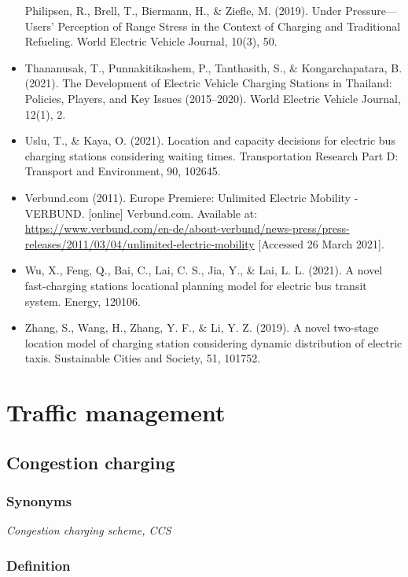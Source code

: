 \documentclass[
]{book}
\begin{document}
\begin{itemize}
  Philipsen, R., Brell, T., Biermann, H., \& Ziefle, M. (2019). Under Pressure---Users' Perception of Range Stress in the Context of Charging and Traditional Refueling. World Electric Vehicle Journal, 10(3), 50.
\item
  Thananusak, T., Punnakitikashem, P., Tanthasith, S., \& Kongarchapatara, B. (2021). The Development of Electric Vehicle Charging Stations in Thailand: Policies, Players, and Key Issues (2015--2020). World Electric Vehicle Journal, 12(1), 2.
\item
  Uslu, T., \& Kaya, O. (2021). Location and capacity decisions for electric bus charging stations considering waiting times. Transportation Research Part D: Transport and Environment, 90, 102645.
\item
  Verbund.com (2011). Europe Premiere: Unlimited Electric Mobility - VERBUND. {[}online{]} Verbund.com. Available at: \url{https://www.verbund.com/en-de/about-verbund/news-press/press-releases/2011/03/04/unlimited-electric-mobility} {[}Accessed 26 March 2021{]}.
\item
  Wu, X., Feng, Q., Bai, C., Lai, C. S., Jia, Y., \& Lai, L. L. (2021). A novel fast-charging stations locational planning model for electric bus transit system. Energy, 120106.
\item
  Zhang, S., Wang, H., Zhang, Y. F., \& Li, Y. Z. (2019). A novel two-stage location model of charging station considering dynamic distribution of electric taxis. Sustainable Cities and Society, 51, 101752.
\end{itemize}

\hypertarget{traffic}{%
\chapter{Traffic management}\label{traffic}}

\hypertarget{congestion_charging}{%
\section{Congestion charging}\label{congestion_charging}}

\hypertarget{synonyms-7}{%
\subsection*{Synonyms}\label{synonyms-7}}

\emph{Congestion charging scheme, CCS}

\hypertarget{definition-8}{%
\subsection*{Definition}\label{definition-8}}
\end{document}

